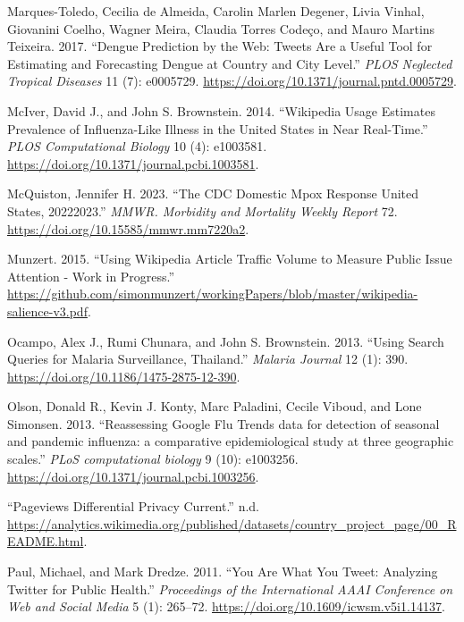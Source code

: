 \documentclass[
  12pt,
]{article}
\newlength{\cslhangindent}
\newenvironment{CSLReferences}[2] %
 {\begin{list}{}{%
  \setlength{\itemindent}{0pt}
  \setlength{\leftmargin}{0pt}
  \setlength{\parsep}{0pt}
  \ifodd #1
   \setlength{\leftmargin}{\cslhangindent}
   \setlength{\itemindent}{-1\cslhangindent}
  \fi
  \setlength{\itemsep}{#2\baselineskip}}}
 {\end{list}}
\begin{document}
\begin{CSLReferences}{1}{0}
Marques-Toledo, Cecilia de Almeida, Carolin Marlen Degener, Livia
Vinhal, Giovanini Coelho, Wagner Meira, Claudia Torres Codeço, and Mauro
Martins Teixeira. 2017. {``Dengue Prediction by the Web: Tweets Are a
Useful Tool for Estimating and Forecasting Dengue at Country and City
Level.''} \emph{PLOS Neglected Tropical Diseases} 11 (7): e0005729.
\url{https://doi.org/10.1371/journal.pntd.0005729}.

McIver, David J., and John S. Brownstein. 2014. {``Wikipedia Usage
Estimates Prevalence of Influenza-Like Illness in the United States in
Near Real-Time.''} \emph{PLOS Computational Biology} 10 (4): e1003581.
\url{https://doi.org/10.1371/journal.pcbi.1003581}.

McQuiston, Jennifer H. 2023. {``The CDC Domestic Mpox Response
{\textemdash} United States, 2022{\textendash}2023.''} \emph{MMWR.
Morbidity and Mortality Weekly Report} 72.
\url{https://doi.org/10.15585/mmwr.mm7220a2}.

Munzert. 2015. {``Using Wikipedia Article Traffic Volume to Measure
Public Issue Attention - Work in Progress.''}
\url{https://github.com/simonmunzert/workingPapers/blob/master/wikipedia-salience-v3.pdf}.

Ocampo, Alex J., Rumi Chunara, and John S. Brownstein. 2013. {``Using
Search Queries for Malaria Surveillance, Thailand.''} \emph{Malaria
Journal} 12 (1): 390. \url{https://doi.org/10.1186/1475-2875-12-390}.

Olson, Donald R., Kevin J. Konty, Marc Paladini, Cecile Viboud, and Lone
Simonsen. 2013. {``Reassessing Google Flu Trends data for detection of
seasonal and pandemic influenza: a comparative epidemiological study at
three geographic scales.''} \emph{PLoS computational biology} 9 (10):
e1003256. \url{https://doi.org/10.1371/journal.pcbi.1003256}.

{``Pageviews Differential Privacy {\textemdash} Current.''} n.d.
\url{https://analytics.wikimedia.org/published/datasets/country_project_page/00_README.html}.

Paul, Michael, and Mark Dredze. 2011. {``You Are What You Tweet:
Analyzing Twitter for Public Health.''} \emph{Proceedings of the
International AAAI Conference on Web and Social Media} 5 (1): 265--72.
\url{https://doi.org/10.1609/icwsm.v5i1.14137}.


\end{CSLReferences}
\end{document}
